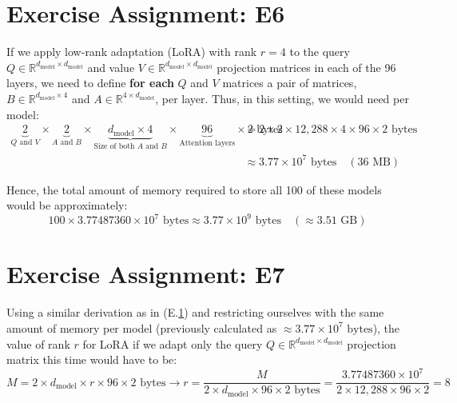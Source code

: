 \documentclass{article}
\begin{document}
\section{Exercise Assignment: E6}\label{sec:e6}
If we apply low-rank adaptation (LoRA) with rank $r=4$ to the query $Q \in \mathbb{R}^{d_{\text{model}} \times d_{\text{model}}}$ and value $V \in \mathbb{R}^{d_{\text{model}} \times d_{\text{model}}}$ projection matrices in each of the 96 layers, we need to define \textbf{for each} $Q$ and $V$ matrices a pair of matrices, $B \in \mathbb{R}^{d_{\text{model}} \times 4}$ and $A \in \mathbb{R}^{4 \times d_{\text{model}}}$, per layer. Thus, in this setting, we would need per model:
\begin{align*}
    \underbrace{2}_{\text{$Q$ and $V$}} \times \underbrace{2}_{\text{$A$ and $B$}} \times \underbrace{d_{\text{model}} \times 4}_{\text{Size of both $A$ and $B$}} \times \underbrace{96}_{\text{Attention layers}} \times 2 \text{ bytes} & = 2 \times 2 \times 12{,}288 \times 4 \times 96 \times 2 \text{ bytes} \\ &\approx 3.77 \times 10^7 \text{ bytes} \quad (36 \text{ MB})
\end{align*}

Hence, the total amount of memory required to store all 100 of these models would be approximately:
\[
    100 \times 3.77487360 \times 10^7 \text{ bytes} \approx 3.77 \times 10^9 \text{ bytes} \quad (\approx 3.51 \text{ GB})
\]


\section{Exercise Assignment: E7}\label{sec:e7}
Using a similar derivation as in (E.\ref{sec:e6}) and restricting ourselves with the same amount of memory per model (previously calculated as $\approx 3.77 \times 10^7 \text{ bytes}$), the value of rank $r$ for LoRA if we adapt only the query $Q \in \mathbb{R}^{d_{\text{model}} \times d_{\text{model}}}$ projection matrix this time would have to be:
\[
    M = 2 \times d_{\text{model}} \times r \times 96 \times 2 \text{ bytes} \rightarrow r = \frac{M}{2 \times d_{\text{model}} \times 96 \times 2 \text{ bytes}} = \frac{3.77487360 \times 10^7}{2 \times 12{,}288 \times 96 \times 2} = 8
\]
\end{document}
